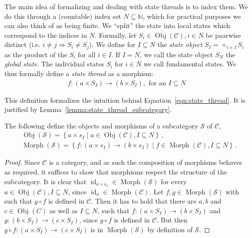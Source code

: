 The main idea of formalizing and dealing with state threads is to index them.
We do this through a (countable) index set $N \subseteq \mathbb{N}$, which for practical purposes we can also think of as being finite.
We ``split'' the state into local states which correspond to the indices in $N$. Formally, let $S_i \in \operatorname{Obj}(\mathcal{C}), i \in N$ be paarwise distinct (i.e. $i \neq j \Rightarrow S_i \neq S_j$).
We define for $I \subseteq N$ the \emph{state object} $S_I = \times_{i \in I} S_i$ as the product of the $S_i$ for all $i \in I$. If $I = N$, we call the state object $S_N$ the \emph{global state}.
The individual states $S_i$ for $i \in N$ we call fundamental states. We thus formally define a \emph{state thread} as a morphism:
\begin{align*}
  f : (a \times S_I) \rightarrow (b \times S_I), \text{ for an } I \subseteq N
\end{align*}

This definition formalizes the intuition behind Equation~\ref{eqn:state_thread}. 
It is justified by Lemma~\ref{lemma:state_thread_subcategory}.

\begin{lem}
\label{lem:state_thread_subcategory}
The following define the objects and morphisms of a subcategory $\mathcal{S}$ of $\mathcal{C}$,
\begin{align}
	& \operatorname{Obj}({\mathcal{S}}) = \left\{ a\times s_I \mid
		a\in\operatorname{Obj}({\mathcal{C}}),
	 	I\subseteq N \right\} \,, \\
	& \operatorname{Morph}({\mathcal{S}}) = \left\{ f : (a\times s_I) \rightarrow (b\times s_I) \mid
		f\in\operatorname{Morph}({\mathcal{C}}),
		I\subseteq N \right\} \,.
\end{align}%
\begin{proof}
Since $\mathcal{C}$ is a category, and as such the composition of morphisms behaves as required, it suffices to show that morphisms respect the structure of the subcategory.
It is clear that $\operatorname{id}_{a\times s_I} \in \operatorname{Morph}(\mathcal{S})$ for every $a \in \operatorname{Obj}(\mathcal{C}), I \subseteq N$, since $\operatorname{id}_a \in \operatorname{Morph}(\mathcal{C})$.
Let $f,g \in \operatorname{Morph}(\mathcal{S})$ with such that $g \circ f$ is defined in $\mathcal{C}$.
Then it has to hold that there are $a,b$ and $c \in \operatorname{Obj}(C)$ as well as $I \subseteq N$, such that $f : (a \times S_I) \rightarrow (b \times S_I)$ and $g : (b \times S_I) \rightarrow (c \times S_I)$,
since $g \circ f$ is defined in $\mathcal{C}$. But then $g \circ f : (a \times S_I) \rightarrow (c \times S_I)$ is in $\operatorname{Morph}(\mathcal{S})$ by definition of $\mathcal{S}$.
\end{proof}
\end{lem}%

